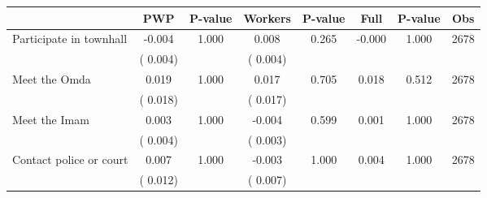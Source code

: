 
\begin{tabular}{l*{7}{c}}\hline&\multicolumn{1}{c}{PWP}&\multicolumn{1}{c}{P-value}&\multicolumn{1}{c}{Workers}&\multicolumn{1}{c}{P-value}&\multicolumn{1}{c}{Full}&\multicolumn{1}{c}{P-value}&\multicolumn{1}{c}{Obs} \\ \hline

 Participate in townhall       &             -0.004       &        1.000  &              0.008       &        0.265  &             -0.000       &              1.000 &  2678 \\ 
                       &       (       0.004)             &                               &       (       0.004)                     &                               &                                               &                                &                      \\ 

 Meet the Omda       &              0.019       &        1.000  &              0.017       &        0.705  &              0.018       &              0.512 &  2678 \\ 
                       &       (       0.018)             &                               &       (       0.017)                     &                               &                                               &                                &                      \\ 

 Meet the Imam       &              0.003       &        1.000  &             -0.004       &        0.599  &              0.001       &              1.000 &  2678 \\ 
                       &       (       0.004)             &                               &       (       0.003)                     &                               &                                               &                                &                      \\ 

 Contact police or court       &              0.007       &        1.000  &             -0.003       &        1.000  &              0.004       &              1.000 &  2678 \\ 
                       &       (       0.012)             &                               &       (       0.007)                     &                               &                                               &                                &                      \\ 


\end{tabular}
